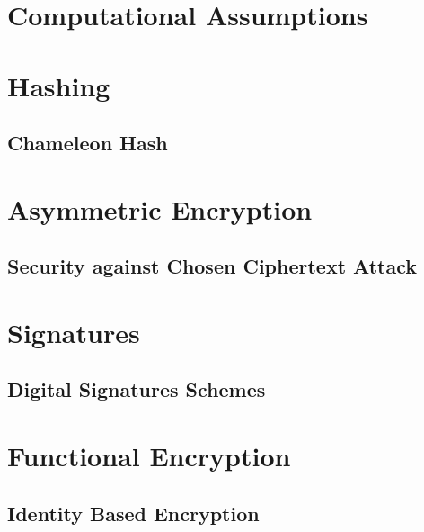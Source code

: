 








\maketitle

\ifTableOfContents 
	\tableofcontents
	\newpage
\fi

\chapter{Computational Assumptions}

\chapter{Hashing}
	\section{Chameleon Hash}
	

\chapter{Asymmetric Encryption}
	\section{Security against Chosen Ciphertext Attack}
	

\chapter{Signatures}
	\section{Digital Signatures Schemes}
	

\chapter{Functional Encryption}
	\section{Identity Based Encryption}
	
	
	
